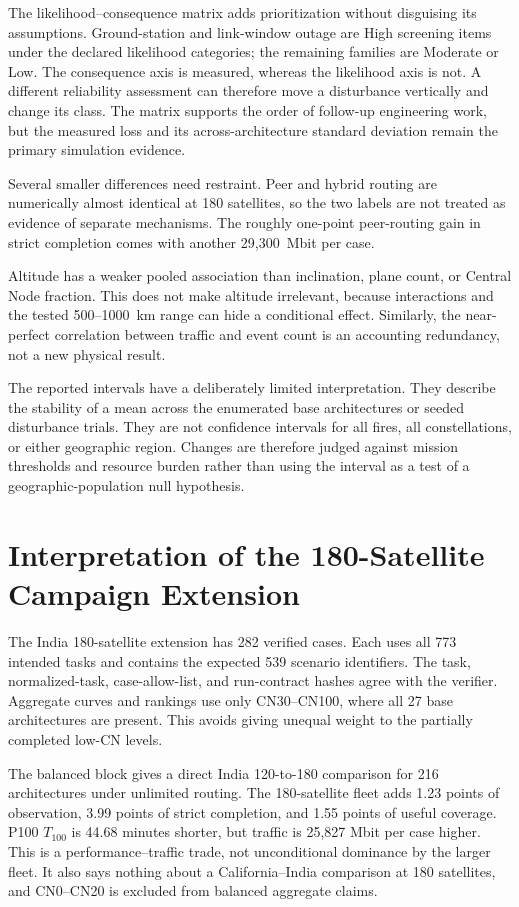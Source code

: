 The likelihood--consequence matrix adds prioritization without disguising its assumptions. Ground-station and link-window outage are High screening items under the declared likelihood categories; the remaining families are Moderate or Low. The consequence axis is measured, whereas the likelihood axis is not. A different reliability assessment can therefore move a disturbance vertically and change its class. The matrix supports the order of follow-up engineering work, but the measured loss and its across-architecture standard deviation remain the primary simulation evidence.

Several smaller differences need restraint. Peer and hybrid routing are numerically almost identical at 180 satellites, so the two labels are not treated as evidence of separate mechanisms. The roughly one-point peer-routing gain in strict completion comes with another 29,300~Mbit per case.

Altitude has a weaker pooled association than inclination, plane count, or Central Node fraction. This does not make altitude irrelevant, because interactions and the tested 500--1000~km range can hide a conditional effect. Similarly, the near-perfect correlation between traffic and event count is an accounting redundancy, not a new physical result.

The reported intervals have a deliberately limited interpretation. They describe the stability of a mean across the enumerated base architectures or seeded disturbance trials. They are not confidence intervals for all fires, all constellations, or either geographic region. Changes are therefore judged against mission thresholds and resource burden rather than using the interval as a test of a geographic-population null hypothesis.

\section{Interpretation of the 180-Satellite Campaign Extension}

The India 180-satellite extension has 282 verified cases. Each uses all 773 intended tasks and contains the expected 539 scenario identifiers. The task, normalized-task, case-allow-list, and run-contract hashes agree with the verifier. Aggregate curves and rankings use only CN30--CN100, where all 27 base architectures are present. This avoids giving unequal weight to the partially completed low-CN levels.

The balanced block gives a direct India 120-to-180 comparison for 216 architectures under unlimited routing. The 180-satellite fleet adds 1.23 points of observation, 3.99 points of strict completion, and 1.55 points of useful coverage. P100 $T_{100}$ is 44.68 minutes shorter, but traffic is 25,827 Mbit per case higher. This is a performance--traffic trade, not unconditional dominance by the larger fleet. It also says nothing about a California--India comparison at 180 satellites, and CN0--CN20 is excluded from balanced aggregate claims.

